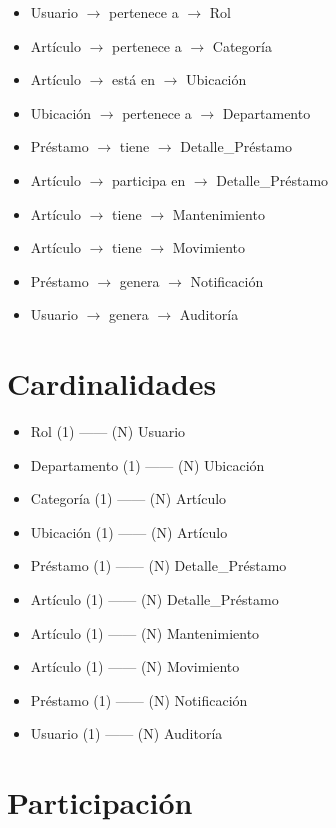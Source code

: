 \documentclass{article}
\begin{document}
\begin{itemize}
    \item Usuario $\rightarrow$ pertenece a $\rightarrow$ Rol
    \item Artículo $\rightarrow$ pertenece a $\rightarrow$ Categoría
    \item Artículo $\rightarrow$ está en $\rightarrow$ Ubicación
    \item Ubicación $\rightarrow$ pertenece a $\rightarrow$ Departamento
    \item Préstamo $\rightarrow$ tiene $\rightarrow$ Detalle\_Préstamo
    \item Artículo $\rightarrow$ participa en $\rightarrow$ Detalle\_Préstamo
    \item Artículo $\rightarrow$ tiene $\rightarrow$ Mantenimiento
    \item Artículo $\rightarrow$ tiene $\rightarrow$ Movimiento
    \item Préstamo $\rightarrow$ genera $\rightarrow$ Notificación
    \item Usuario $\rightarrow$ genera $\rightarrow$ Auditoría
\end{itemize}

\section{Cardinalidades}

\begin{itemize}
    \item Rol (1) ------ (N) Usuario
    \item Departamento (1) ------ (N) Ubicación
    \item Categoría (1) ------ (N) Artículo
    \item Ubicación (1) ------ (N) Artículo
    \item Préstamo (1) ------ (N) Detalle\_Préstamo
    \item Artículo (1) ------ (N) Detalle\_Préstamo
    \item Artículo (1) ------ (N) Mantenimiento
    \item Artículo (1) ------ (N) Movimiento
    \item Préstamo (1) ------ (N) Notificación
    \item Usuario (1) ------ (N) Auditoría
\end{itemize}

\section{Participación}
\end{document}
